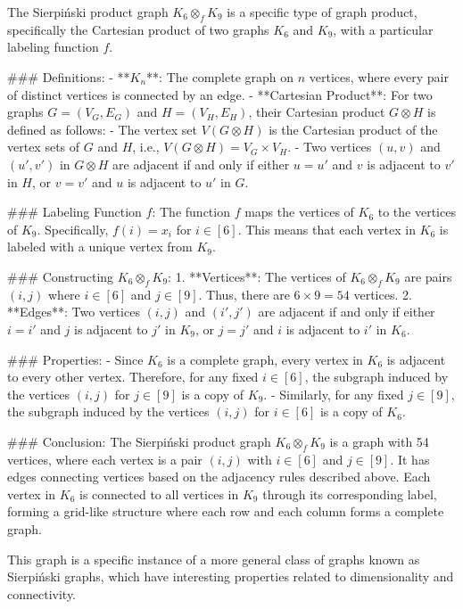 The Sierpiński product graph \( K_6 \otimes_f K_9 \) is a specific type of graph product, specifically the Cartesian product of two graphs \( K_6 \) and \( K_9 \), with a particular labeling function \( f \).

### Definitions:
- **\( K_n \)**: The complete graph on \( n \) vertices, where every pair of distinct vertices is connected by an edge.
- **Cartesian Product**: For two graphs \( G = (V_G, E_G) \) and \( H = (V_H, E_H) \), their Cartesian product \( G \otimes H \) is defined as follows:
  - The vertex set \( V(G \otimes H) \) is the Cartesian product of the vertex sets of \( G \) and \( H \), i.e., \( V(G \otimes H) = V_G \times V_H \).
  - Two vertices \((u, v)\) and \((u', v')\) in \( G \otimes H \) are adjacent if and only if either \( u = u' \) and \( v \) is adjacent to \( v' \) in \( H \), or \( v = v' \) and \( u \) is adjacent to \( u' \) in \( G \).

### Labeling Function \( f \):
The function \( f \) maps the vertices of \( K_6 \) to the vertices of \( K_9 \). Specifically, \( f(i) = x_i \) for \( i \in [6] \). This means that each vertex in \( K_6 \) is labeled with a unique vertex from \( K_9 \).

### Constructing \( K_6 \otimes_f K_9 \):
1. **Vertices**: The vertices of \( K_6 \otimes_f K_9 \) are pairs \((i, j)\) where \( i \in [6] \) and \( j \in [9] \). Thus, there are \( 6 \times 9 = 54 \) vertices.
2. **Edges**: Two vertices \((i, j)\) and \((i', j')\) are adjacent if and only if either \( i = i' \) and \( j \) is adjacent to \( j' \) in \( K_9 \), or \( j = j' \) and \( i \) is adjacent to \( i' \) in \( K_6 \).

### Properties:
- Since \( K_6 \) is a complete graph, every vertex in \( K_6 \) is adjacent to every other vertex. Therefore, for any fixed \( i \in [6] \), the subgraph induced by the vertices \((i, j)\) for \( j \in [9] \) is a copy of \( K_9 \).
- Similarly, for any fixed \( j \in [9] \), the subgraph induced by the vertices \((i, j)\) for \( i \in [6] \) is a copy of \( K_6 \).

### Conclusion:
The Sierpiński product graph \( K_6 \otimes_f K_9 \) is a graph with 54 vertices, where each vertex is a pair \((i, j)\) with \( i \in [6] \) and \( j \in [9] \). It has edges connecting vertices based on the adjacency rules described above. Each vertex in \( K_6 \) is connected to all vertices in \( K_9 \) through its corresponding label, forming a grid-like structure where each row and each column forms a complete graph.

This graph is a specific instance of a more general class of graphs known as Sierpiński graphs, which have interesting properties related to dimensionality and connectivity.